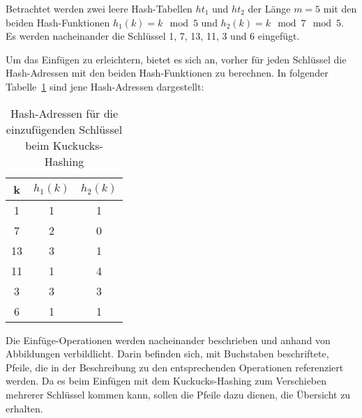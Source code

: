 Betrachtet werden zwei leere Hash-Tabellen \(ht_{1}\) und \(ht_{2}\) der Länge \(m=5\) mit den beiden Hash-Funktionen \(h_{1}(k)=k\mod{5}\) und \(h_{2}(k)=k\mod{7}\mod{5}\). Es werden nacheinander die Schlüssel 1, 7, 13, 11, 3 und 6 eingefügt. 

Um das Einfügen zu erleichtern, bietet es sich an, vorher für jeden Schlüssel die Hash-Adressen mit den beiden Hash-Funktionen zu berechnen. In folgender Tabelle~\ref{tab:hashwerte_k} sind jene Hash-Adressen dargestellt: 
\begin{table}[H]
	\centering
	\begin{tabular}{|c|c|c|}
		\hline
		k & \(h_{1}(k)\) & \(h_{2}(k)\) \\ \hline
		1 & 1 & 1 \\
		7 & 2 & 0 \\
		13 & 3 & 1 \\
		11 & 1 & 4 \\
		3 & 3 & 3 \\
		6 & 1 & 1 \\ \hline
	\end{tabular}
	\caption{Hash-Adressen für die einzufügenden Schlüssel beim Kuckucks-Hashing}
 	\label{tab:hashwerte_k}
\end{table}
Die Einfüge-Operationen werden nacheinander beschrieben und anhand von Abbildungen verbildlicht. Darin befinden sich, mit Buchstaben beschriftete, Pfeile, die in der Beschreibung zu den entsprechenden Operationen referenziert werden. Da es beim Einfügen mit dem Kuckucks-Hashing zum Verschieben mehrerer Schlüssel kommen kann, sollen die Pfeile dazu dienen, die Übersicht zu erhalten. 

